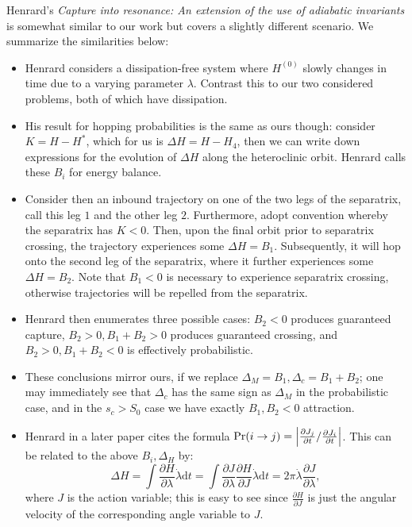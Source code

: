 \documentclass[11pt,
        usenames, %
        dvipsnames %
    ]{article}
\newcommand*{\pd}[2]{\frac{\partial#1}{\partial#2}}
\DeclarePairedDelimiter\abs{\lvert}{\rvert}
\DeclarePairedDelimiter\p{\lparen}{\rparen}
\begin{document}
Henrard's \emph{Capture into resonance: An extension of the use of adiabatic
invariants} is somewhat similar to our work but covers a slightly different
scenario. We summarize the similarities below:
\begin{itemize}
    \item Henrard considers a dissipation-free system where $H^{(0)}$ slowly
        changes in time due to a varying parameter $\lambda$. Contrast this to
        our two considered problems, both of which have dissipation.

    \item His result for hopping probabilities is the same as ours though:
        consider $K = H - H^*$, which for us is $\Delta H = H - H_4$, then
        we can write down expressions for the evolution of $\Delta H$ along the
        heteroclinic orbit. Henrard calls these $B_i$ for energy balance.

    \item Consider then an inbound trajectory on one of the two legs of the
        separatrix, call this leg $1$ and the other leg $2$. Furthermore, adopt
        convention whereby the separatrix has $K < 0$. Then, upon the final
        orbit prior to separatrix crossing, the trajectory experiences some
        $\Delta H = B_1$. Subsequently, it will hop onto the second leg of the
        separatrix, where it further experiences some $\Delta H = B_2$. Note
        that $B_1 < 0$ is necessary to experience separatrix crossing, otherwise
        trajectories will be repelled from the separatrix.

    \item Henrard then enumerates three possible cases: $B_2 < 0$ produces
        guaranteed capture, $B_2 > 0, B_1 + B_2 > 0$ produces guaranteed
        crossing, and $B_2 > 0, B_1 + B_2 < 0$ is effectively probabilistic.

    \item These conclusions mirror ours, if we replace $\Delta_M = B_1, \Delta_c
        = B_1 + B_2$; one may immediately see that $\Delta_c$ has the same sign
        as $\Delta_M$ in the probabilistic case, and in the $s_c > S_{0}$ case
        we have exactly $B_1, B_2 < 0$ attraction.

    \item Henrard in a later paper cites the formula $\Pr\p*{i \to j} =
        \abs*{\pd{J_j}{t} / \pd{J_i}{t}}$. This can be related to the above
        $B_i, \Delta_H$ by:
        \begin{equation}
            \Delta H = \int \pd{H}{\lambda}\dot{\lambda}\mathrm{d}t
                = \int \pd{J}{\lambda}\pd{H}{J}\dot{\lambda}\mathrm{d}t
                = 2\pi \dot{\lambda}\pd{J}{\lambda},
        \end{equation}
        where $J$ is the action variable; this is easy to see since $\pd{H}{J}$
        is just the angular velocity of the corresponding angle variable to $J$.
\end{itemize}
\end{document}
